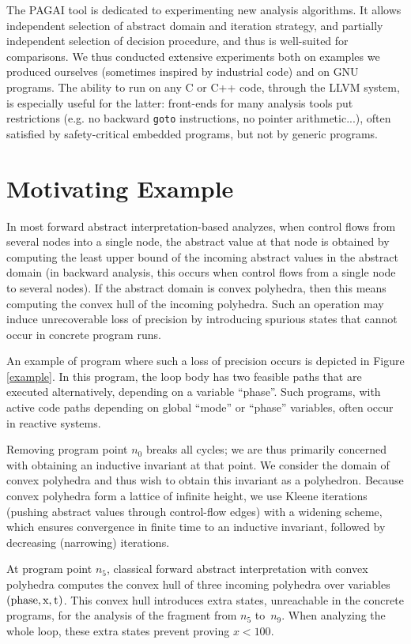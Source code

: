 \documentclass{entcs}
\begin{document}
The PAGAI tool is dedicated to experimenting new analysis algorithms.
It allows independent selection of abstract domain and iteration strategy, and partially independent selection of decision procedure, and thus is well-suited for comparisons.
We thus conducted extensive experiments both on examples we produced ourselves (sometimes inspired by industrial code) and on GNU programs.
The ability to run on any C or C++ code, through the LLVM system, is especially useful for the latter: front-ends for many analysis tools put restrictions (e.g. no backward \lstinline|goto| instructions, no pointer arithmetic...), often satisfied by safety-critical embedded programs, but not by generic programs.

\section{Motivating Example}
In most forward abstract interpretation-based analyzes, when control flows from several nodes into a single node, the abstract value at that node is obtained by computing the least upper bound of the incoming abstract values in the abstract domain (in backward analysis, this occurs when control flows from a single node to several nodes).
If the abstract domain is convex polyhedra, then this means computing the convex hull of the incoming polyhedra.
Such an operation may induce unrecoverable loss of precision by introducing spurious states that cannot occur in concrete program runs.

An example of program where such a loss of precision occurs is depicted in
Figure \ref{example}.
In this program, the loop body has two feasible paths that
are executed alternatively, depending on a variable ``phase''.
Such programs, with active code paths depending on global ``mode'' or ``phase'' variables, often occur in reactive systems.

Removing program point $n_0$ breaks all cycles; we are thus primarily concerned with obtaining an inductive invariant at that point.
We consider the domain of convex polyhedra and thus wish to obtain this invariant as a polyhedron.
Because convex polyhedra form a lattice of infinite height, we use Kleene iterations (pushing abstract values through control-flow edges) with a widening scheme, which ensures convergence in finite time to an inductive invariant, followed by decreasing (narrowing) iterations.

At program point $n_5$, classical forward abstract interpretation with convex polyhedra computes the convex hull of three incoming polyhedra over variables $(\lstinline|phase|,\lstinline|x|,\lstinline|t|)$. This convex hull introduces extra states, unreachable in the concrete programs, for the analysis of the fragment from $n_5$ to~$n_9$. When analyzing the whole loop, these extra states prevent proving $x < 100$.
\end{document}
